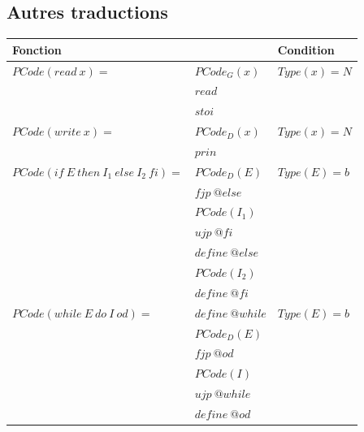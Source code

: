 \documentclass[french,11pt,twoside]{article}
\begin{document}
\subsection{Autres traductions}

\begin{tabular}{| l l | l |}
\hline
Fonction                                 &                                                                          & Condition \\
\hline
$PCode(read\ x)=$                  & $PCode_G(x)$                                            & $Type(x)=N$\\
                                                & $ read$                                                      & \\
                                                & $ sto i$                                                      & \\
\hline
$PCode(write\ x)=$                 &  $PCode_D(x) $                                           & $Type(x)=N$\\
                                                & $ prin$                                                      & \\            
\hline
$PCode(if\ E\ then\ I_1\ else\ I_2\ fi) =$ & $PCode_D(E)$                &  $Type(E)=b$\\
                                                                & $fjp\ @else$                                          & \\
                                                                & $PCode(I_1)$                                          & \\
                                                                & $ujp\ @fi$                                 & \\
                                                                & $define\ @else$             &\\
                                                                & $PCode(I_2)$                        & \\
                                                                & $define\ @fi$                                               &\\
\hline
$PCode(while\ E\ do\ I\ od) =$    & $define\ @while$      & $Type(E)=b$\\
                                                    & $PCode_D(E)$            &\\
                                                    & $fjp\ @od $               &\\
                                                    & $PCode(I)$                &\\
                                                    & $ujp\ @while$          &\\
                                                    & $define\ @od$            &\\
\hline
\end{tabular}
\end{document}
